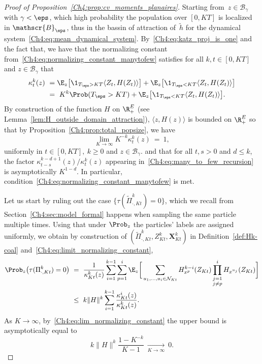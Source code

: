 \begin{refsegment}
\begin{proof}[Proof of Proposition~\ref{Ch4:prop:cv_moments_planaires}]
Starting from~$z\in\mathscr{B}_\gamma$ with $\gamma<\eps$, which high probability the population over $[0,KT]$ is localized in $\mathscr{B}_\eps$, thus in the bassin of attraction of~$\tilde h$ for the dynamical system~\eqref{Ch4:eq:mean_dynamical_system}.
By~\eqref{Ch4:eq:katz_proj_is_one} and the fact that, we have that the normalizing constant from~\eqref{Ch4:eq:normalizing_constant_manytofew} satisfies for all $k,t\in[0,KT]$ and $z\in\mathscr{B}_\gamma$ that
\begin{align*} 
 \kappa^k_{t}(z)\ &= \E_{z}\big[\1_{T_{\eps}>KT}\langle Z_{t}, H(Z_t)\rangle\big]+ \E_{z}\big[\1_{T_{\eps}<KT}\langle Z_{t}, H(Z_t)\rangle\big]\\
 &=\ K^k\Prob(T_{\eps}>KT)+ \E_{z}\big[\1_{T_{\eps}<KT}\langle Z_{t}, H(Z_t)\rangle\big].
\end{align*}
By construction of the function $H$ on $\R_+^E$ (see Lemma~\ref{lem:H_outside_domain_attraction}), $\langle z, H(z)\rangle$ is bounded on $\R_+^E$ so that by Proposition~\ref{Ch4:prop:total_popsize}, we have
\begin{equation}\label{Ch4:eq:lim_normalizing_constant}
\lim_{K\to\infty }K^{-k}\kappa^k_{t}(z)\ = \  1,
\end{equation}
uniformly in $t\in [0,KT],\ k\geq 0$ and $z\in \mathscr{B}_\gamma$.
and that for all $t,s>0$ and $d\leq k$, the factor $\kappa^{k-d+1}_{t-s}(z)/\kappa^k_{t}(z)$ appearing in~\eqref{Ch4:eq:many_to_few_recursion} is asymptotically $K^{1-d}$. In particular, condition~\eqref{Ch4:eq:normalizing_constant_manytofew} is met.


Let us start by ruling out the case $\{\tau(\tilde\Pi^k_{\cdot,Kt})=0\}$, which we recall from Section~\ref{Ch4:sec:model_formal} happens when sampling the same particle multiple times. Using that under $\Prob_z$ the particles' labels are assigned uniformly, we obtain by construction of $(\tilde\Pi^k_{\cdot,Kt},Z^k_{Kt},\bm X^k_{Kt})$ in Definition~\ref{def:Hk-coal} and~\eqref{Ch4:eq:limit_normalizing_constant},
\begin{align*}
\Prob_{z}\big(\tau(\Pi^k_{\cdot,Kt})=0 \big)\ &=\ \frac{1}{\kappa^k_{Kt}(z)}\sum_{i=1}^{k-1}\sum_{p=1}^i\E_z\bigg[ \sum_{u_1,\ldots,u_i\in \mathcal{N}_{Kt}}  H_{x^p}^{k-i}(Z_{Kt})\prod_{\substack{j=1\\ j\neq p}}^i H_{x^{u_j}}(Z_{Kt})\bigg]\\
&\leq \  k \lVert H\rVert^k \sum_{i=1}^{k-1} \frac{\kappa^{i}_{Kt}(z)}{\kappa^k_{Kt}(z)}.
\end{align*}
As $K\to\infty$, by~\eqref{Ch4:eq:lim_normalizing_constant} the upper bound is asymptotically equal to
\[
k \lVert H\rVert^k \frac{1-K^{-k}}{K-1}\ \underset{K\to\infty}{\longrightarrow}\ 0.
\]
  

\end{proof}
\end{refsegment}
